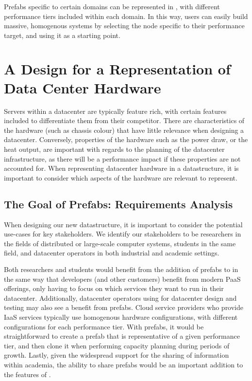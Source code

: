\documentclass[11pt]{article}
\begin{document}
		Prefabs specific to certain domains can be represented in \opendc{}, with different performance tiers included within each domain.
		In this way, users can easily build massive, homogenous systems by selecting the node specific to their performance target, and using it as a starting point.

\newpage

\section{A Design for a Representation of Data Center Hardware} \label{sec:design}
	Servers within a datacenter are typically feature rich, with certain features included to differentiate them from their competitor.
	There are characteristics of the hardware (such as chassis colour) that have little relevance when designing a datacenter.
	Conversely, properties of the hardware such as the power draw, or the heat output, are important with regards to the planning of the datacenter infrastructure, as there will be a performance impact if these properties are not accounted for.
	When representing datacenter hardware in a datastructure, it is important to consider which aspects of the hardware are relevant to represent.
	
	\subsection{The Goal of Prefabs: Requirements Analysis}
		When designing our new datastructure, it is important to consider the potential use-cases for key stakeholders.
		We identify our stakeholders to be researchers in the fields of distributed or large-scale computer systems, students in the same field, and datacenter operators in both industrial and academic settings.

		Both researchers and students would benefit from the addition of prefabs to \opendc{} in the same way that developers (and other customers) benefit from modern PaaS offerings, only having to focus on which services they want to run in their datacenter.
		Additionally, datacenter operators using \opendc{} for datacenter design and testing may also see a benefit from prefabs. 
		Cloud service providers who provide IaaS services typically use homogenous hardware configurations, with different configurations for each performance tier. 
		With prefabs, it would be straightforward to create a prefab that is representative of a given performance tier, and then clone it when performing capacity planning during periods of growth.
		Lastly, given the widespread support for the sharing of information within academia, the ability to share prefabs would be an important addition to the features of \opendc{}.
\end{document}
